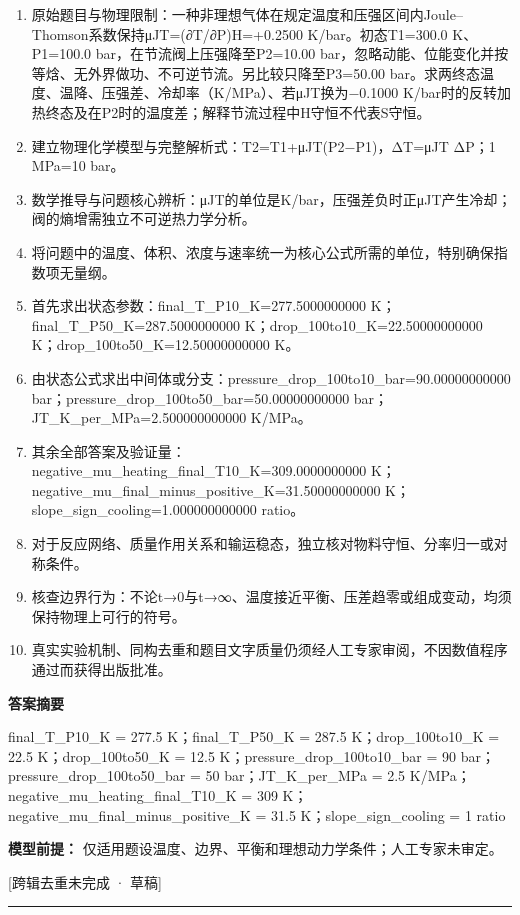 \documentclass[UTF8,11pt,a4paper]{ctexart}
\begin{document}
\begin{enumerate}
\item 原始题目与物理限制：一种非理想气体在规定温度和压强区间内Joule–Thomson系数保持μJT=(∂T/∂P)H=+0.2500 K/bar。初态T1=300.0 K、P1=100.0 bar，在节流阀上压强降至P2=10.00 bar，忽略动能、位能变化并按等焓、无外界做功、不可逆节流。另比较只降至P3=50.00 bar。求两终态温度、温降、压强差、冷却率（K/MPa）、若μJT换为−0.1000 K/bar时的反转加热终态及在P2时的温度差；解释节流过程中H守恒不代表S守恒。
\item 建立物理化学模型与完整解析式：T2=T1+μJT(P2−P1)，ΔT=μJT ΔP；1 MPa=10 bar。
\item 数学推导与问题核心辨析：μJT的单位是K/bar，压强差负时正μJT产生冷却；阀的熵增需独立不可逆热力学分析。
\item 将问题中的温度、体积、浓度与速率统一为核心公式所需的单位，特别确保指数项无量纲。
\item 首先求出状态参数：final\_T\_P10\_K=277.5000000000 K；final\_T\_P50\_K=287.5000000000 K；drop\_100to10\_K=22.50000000000 K；drop\_100to50\_K=12.50000000000 K。
\item 由状态公式求出中间体或分支：pressure\_drop\_100to10\_bar=90.00000000000 bar；pressure\_drop\_100to50\_bar=50.00000000000 bar；JT\_K\_per\_MPa=2.500000000000 K/MPa。
\item 其余全部答案及验证量：negative\_mu\_heating\_final\_T10\_K=309.0000000000 K；negative\_mu\_final\_minus\_positive\_K=31.50000000000 K；slope\_sign\_cooling=1.000000000000 ratio。
\item 对于反应网络、质量作用关系和输运稳态，独立核对物料守恒、分率归一或对称条件。
\item 核查边界行为：不论t→0与t→∞、温度接近平衡、压差趋零或组成变动，均须保持物理上可行的符号。
\item 真实实验机制、同构去重和题目文字质量仍须经人工专家审阅，不因数值程序通过而获得出版批准。
\end{enumerate}
\noindent\textbf{答案摘要}\par
final\_T\_P10\_K = 277.5 K；final\_T\_P50\_K = 287.5 K；drop\_100to10\_K = 22.5 K；drop\_100to50\_K = 12.5 K；pressure\_drop\_100to10\_bar = 90 bar；pressure\_drop\_100to50\_bar = 50 bar；JT\_K\_per\_MPa = 2.5 K/MPa；negative\_mu\_heating\_final\_T10\_K = 309 K；negative\_mu\_final\_minus\_positive\_K = 31.5 K；slope\_sign\_cooling = 1 ratio\par
\noindent\textbf{模型前提：}
仅适用题设温度、边界、平衡和理想动力学条件；人工专家未审定。\par
\noindent\textcolor{red!65!black}{[跨辑去重未完成 · 草稿]} \par
\medskip\hrule\medskip
{}
\end{document}
